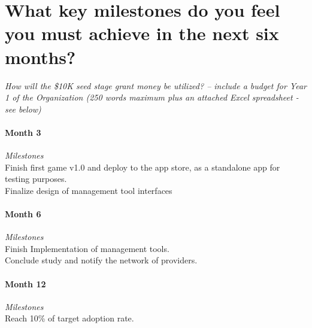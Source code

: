 \section{What key milestones do you feel you must achieve in the next six months?}

\textit{How will the \$10K seed stage grant money be utilized? – include a budget for Year 1 of the Organization (250 words maximum plus an attached Excel spreadsheet - see below)}  

\paragraph{Month 3} \textit{Milestones}\\
Finish first game v1.0 and deploy to the app store, as a standalone app for testing purposes. \\
Finalize design of management tool interfaces

\paragraph{Month 6} \textit{Milestones}\\
Finish Implementation of management tools. \\
Conclude study and notify the network of providers.

\paragraph{Month 12} \textit{Milestones}\\
Reach 10\% of target adoption rate.